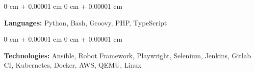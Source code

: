 \documentclass[10pt, a4paper]{article}
\newenvironment{onecolentry}{
    \begin{adjustwidth}{
        0 cm + 0.00001 cm
    }{
        0 cm + 0.00001 cm
    }
}{
    \end{adjustwidth}
} %
\begin{document}
        \begin{onecolentry}
            \textbf{Languages:} Python, Bash, Groovy, PHP, TypeScript
        \end{onecolentry}

        \vspace{0.2 cm}

        \begin{onecolentry}
            \textbf{Technologies:} Ansible, Robot Framework, Playwright, Selenium, Jenkins, Gitlab CI, Kubernetes, Docker, AWS, QEMU, Linux
        \end{onecolentry}
\end{document}

